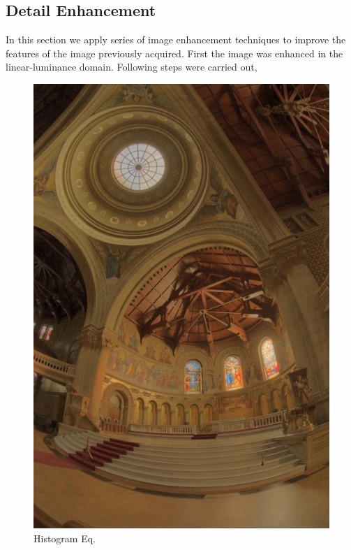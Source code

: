 \documentclass{article}
\begin{document}
    \subsection*{Detail Enhancement}
    In this section we apply series of image enhancement techniques to improve the features of the image previously acquired.
    First the image was enhanced in the linear-luminance domain. Following steps were carried out, \\
    \begin{figure}[!htb]
      \includegraphics[scale=.27]{./data/2/ln/s1.jpg}
      \caption{Histogram Eq.}
    \endminipage\hfill

\end{figure}
\end{document}
